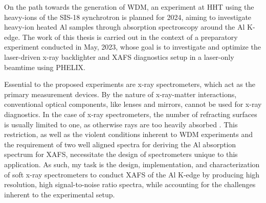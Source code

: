 On the path towards the generation of WDM, an 
experiment at HHT using the heavy-ions of the SIS-18 
synchrotron is planned for 2024, 
aiming to 
investigate heavy-ion heated Al samples through 
absorption 
spectroscopy around the Al K-edge. The work of this 
thesis is carried out in the context of a 
preparatory experiment conducted in May, 2023, 
whose goal is to investigate and optimize
the laser-driven x-ray backlighter and XAFS diagnostics setup in a 
laser-only beamtime using PHELIX.

Essential to the proposed experiments are x-ray spectrometers, which act as the primary measurement devices. By the nature of x-ray-matter interactions, conventional optical components, like lenses and mirrors, cannot be used for x-ray diagnostics. In the case of x-ray spectrometers, the number of refracting surfaces is usually limited to one, as otherwise rays are too heavily absorbed \citep{kunze2009introduction}. This restriction, as well as the violent conditions inherent to WDM experiments and the requirement of two well aligned spectra for deriving the Al absorption spectrum for XAFS, necessitate the design of spectrometers unique to this application. As such, my task is the design, implementation, and characterization of soft x-ray spectrometers to conduct XAFS of the Al K-edge by producing high resolution, high signal-to-noise ratio spectra, while accounting for the challenges inherent to the experimental setup.

